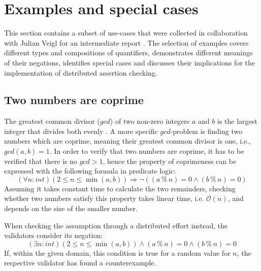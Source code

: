 \section{Examples and special cases}\label{sec:examples}
This section contains a subset of use-cases that were collected in collaboration with Julian Veigl for an intermediate report \cite{bernhardt_veigel_2020}. The selection of examples covers different types and compositions of quantifiers, demonstrates different meanings of their negations, identifies special cases and discusses their implications for the implementation of distributed assertion checking.

\subsection{Two numbers are coprime}\label{sec:coprime}
The greatest common divisor ($gcd$) of two non-zero integers $a$ and $b$ is the largest integer that divides both evenly \cite{hardy2008introduction}. A more specific $gcd$-problem is finding two numbers which are coprime, meaning their greatest common divisor is one, i.e., $gcd(a, b) = 1$. In order to verify that two numbers are coprime, it has to be verified that there is no $gcd > 1$, hence the property of coprimeness can be expressed with the following formula in predicate logic:
\begin{equation}\label{eq:coprime-universial}
    (\forall n : int) (2 \le n \le \min(a,b)) \Rightarrow \neg((a \mathbin{\%} n) = 0 \land (b \mathbin{\%} n) = 0)
\end{equation}
Assuming it takes constant time to calculate the two remainders, checking whether two numbers satisfy this property takes linear time, i.e. $\mathcal{O}(n)$, and depends on the size of the smaller number.

When checking the assumption through a distributed effort instead, the validators consider its negation:
\begin{equation}\label{eq:coprime-existential}
    (\exists n : int) (2 \le n \le \min(a,b)) \land (a \mathbin{\%} n) = 0 \land (b \mathbin{\%} n) = 0
\end{equation}
If, within the given domain, this condition is true for a random value for $n$, the respective validator has found a counterexample.

